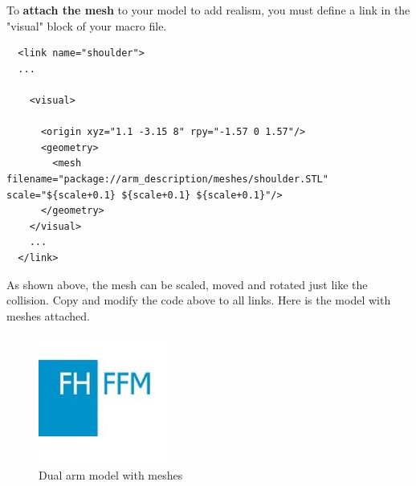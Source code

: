 \documentclass[pdftex,12pt,a4paper]{article}
\begin{document}
  \newpage
  To \textbf{attach the mesh} to your model to add realism, you must define a link in the "visual" block of your macro file.\\
  \begin{lstlisting}
  <link name="shoulder">
  ...
  
    <visual>
    
      <origin xyz="1.1 -3.15 8" rpy="-1.57 0 1.57"/>
      <geometry>
    	<mesh   filename="package://arm_description/meshes/shoulder.STL" scale="${scale+0.1} ${scale+0.1} ${scale+0.1}"/>
      </geometry>
    </visual>
    ...
  </link>
  \end{lstlisting}
  As shown above, the mesh can be scaled, moved and rotated just like the collision. Copy and modify the code above to all links. Here is the model with meshes attached.
  \begin{figure}[h]
      \centering
      \includegraphics[width=0.6\linewidth]{image/FH-Frankfurt.jpg}
      \caption{Dual arm model with meshes}
      \label{fig:arm_gazebo_mesh}
  \end{figure}
  
  \newpage
\end{document}
